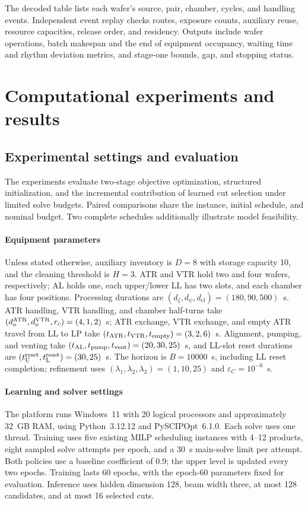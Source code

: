 \documentclass[final,5p,times,twocolumn]{elsarticle}
\begin{document}
The decoded table lists each wafer's source, pair, chamber, cycles, and handling events. Independent event replay checks routes, exposure counts, auxiliary reuse, resource capacities, release order, and residency. Outputs include wafer operations, batch makespan and the end of equipment occupancy, waiting time and rhythm deviation metrics, and stage-one bounds, gap, and stopping status.

\section{Computational experiments and results}
\label{sec:experiments-cn}
\subsection{Experimental settings and evaluation}
\label{sec:experiment-settings-cn}
The experiments evaluate two-stage objective optimization, structured initialization, and the incremental contribution of learned cut selection under limited solve budgets. Paired comparisons share the instance, initial schedule, and nominal budget. Two complete schedules additionally illustrate model feasibility.

\paragraph{Equipment parameters}
Unless stated otherwise, auxiliary inventory is $D=8$ with storage capacity 10, and the cleaning threshold is $H=3$. ATR and VTR hold two and four wafers, respectively; AL holds one, each upper/lower LL has two slots, and each chamber has four positions. Processing durations are $(d_\zeta,d_\psi,d_{\mathrm{cl}})=(180,90,500)$~s. ATR handling, VTR handling, and chamber half-turns take $(d_o^{\rm ATR},d_o^{\rm VTR},r_c)=(4,1,2)$~s; ATR exchange, VTR exchange, and empty ATR travel from LL to LP take $(t_{\rm ATR},t_{\rm VTR},t_{\rm empty})=(3,2,6)$~s. Alignment, pumping, and venting take $(t_{\rm AL},t_{\rm pump},t_{\rm vent})=(20,30,25)$~s, and LL-slot reset durations are $(t_{\rm U}^{\rm reset},t_{\rm L}^{\rm reset})=(30,25)$~s. The horizon is $B=10000$~s, including LL reset completion; refinement uses $(\lambda_1,\lambda_2,\lambda_3)=(1,10,25)$ and $\varepsilon_C=10^{-6}$~s.

\paragraph{Learning and solver settings}
The platform runs Windows~11 with 20 logical processors and approximately 32~GB RAM, using Python~3.12.12 and PySCIPOpt~6.1.0. Each solve uses one thread. Training uses five existing MILP scheduling instances with 4--12 products, eight sampled solve attempts per epoch, and a 30~s main-solve limit per attempt. Both policies use a baseline coefficient of 0.9; the upper level is updated every two epochs. Training lasts 60 epochs, with the epoch-60 parameters fixed for evaluation. Inference uses hidden dimension 128, beam width three, at most 128 candidates, and at most 16 selected cuts.
\end{document}
